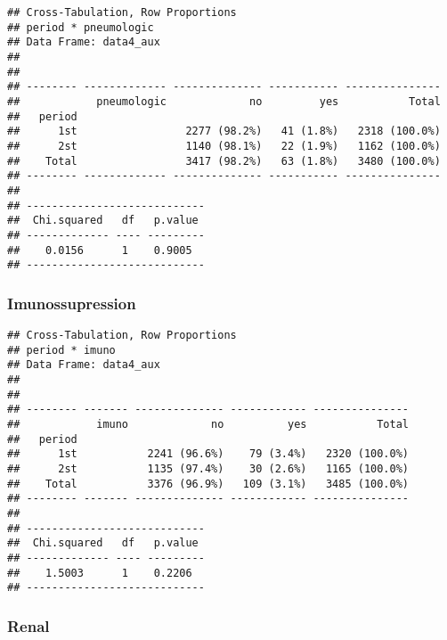 \documentclass[
]{article}
\newenvironment{Shaded}{\begin{snugshade}}{\end{snugshade}}
\newcommand{\DataTypeTok}[1]{\textcolor[rgb]{0.13,0.29,0.53}{#1}}
\newcommand{\KeywordTok}[1]{\textcolor[rgb]{0.13,0.29,0.53}{\textbf{#1}}}
\newcommand{\NormalTok}[1]{#1}
\newcommand{\OperatorTok}[1]{\textcolor[rgb]{0.81,0.36,0.00}{\textbf{#1}}}
\newcommand{\OtherTok}[1]{\textcolor[rgb]{0.56,0.35,0.01}{#1}}
\newcommand{\StringTok}[1]{\textcolor[rgb]{0.31,0.60,0.02}{#1}}
\begin{document}
\begin{verbatim}
## Cross-Tabulation, Row Proportions  
## period * pneumologic  
## Data Frame: data4_aux  
## 
## 
## -------- ------------- -------------- ----------- ---------------
##            pneumologic             no         yes           Total
##   period                                                         
##      1st                 2277 (98.2%)   41 (1.8%)   2318 (100.0%)
##      2st                 1140 (98.1%)   22 (1.9%)   1162 (100.0%)
##    Total                 3417 (98.2%)   63 (1.8%)   3480 (100.0%)
## -------- ------------- -------------- ----------- ---------------
## 
## ----------------------------
##  Chi.squared   df   p.value 
## ------------- ---- ---------
##    0.0156      1    0.9005  
## ----------------------------
\end{verbatim}

\hypertarget{imunossupression-2}{%
\subsubsection{Imunossupression}\label{imunossupression-2}}

\begin{Shaded}
\end{Shaded}

\begin{verbatim}
## Cross-Tabulation, Row Proportions  
## period * imuno  
## Data Frame: data4_aux  
## 
## 
## -------- ------- -------------- ------------ ---------------
##            imuno             no          yes           Total
##   period                                                    
##      1st           2241 (96.6%)    79 (3.4%)   2320 (100.0%)
##      2st           1135 (97.4%)    30 (2.6%)   1165 (100.0%)
##    Total           3376 (96.9%)   109 (3.1%)   3485 (100.0%)
## -------- ------- -------------- ------------ ---------------
## 
## ----------------------------
##  Chi.squared   df   p.value 
## ------------- ---- ---------
##    1.5003      1    0.2206  
## ----------------------------
\end{verbatim}

\hypertarget{renal-2}{%
\subsubsection{Renal}\label{renal-2}}
\end{document}
